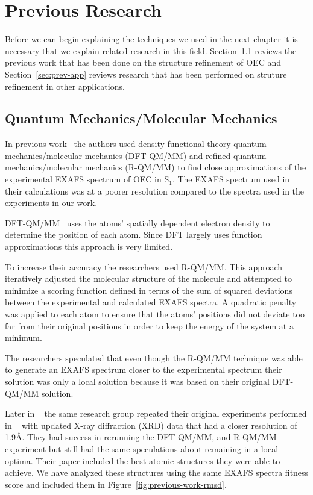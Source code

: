 \chapter{Previous Research}

Before we can begin explaining the techniques we used in the next chapter it is necessary that we explain related research in this field. Section~\ref{sec:prev-work} reviews the previous work that has been done on the structure refinement of OEC and Section~\ref{sec:prev-app} reviews research that has been performed on struture refinement in other applications.

\section{Quantum Mechanics/Molecular Mechanics}
\label{sec:prev-work}

In previous work~\cite{sproviero2008model} the authors used density functional theory quantum mechanics/molecular mechanics (DFT-QM/MM) and refined quantum mechanics/molecular mechanics (R-QM/MM) to find close approximations of the experimental EXAFS spectrum of OEC in S$_{1}$. The EXAFS spectrum used in their calculations was at a poorer resolution compared to the spectra used in the experiments in our work.

DFT-QM/MM~\cite{parr1989density} uses the atoms' spatially dependent electron density to determine the position of each atom. Since DFT largely uses function approximations this approach is very limited.

To increase their accuracy the researchers used R-QM/MM. This approach iteratively adjusted the molecular structure of the molecule and attempted to minimize a scoring function defined in terms of the sum of squared deviations between the experimental and calculated EXAFS spectra. A quadratic penalty was applied to each atom to ensure that the atoms' positions did not deviate too far from their original positions in order to keep the energy of the system at a minimum.

The researchers speculated that even though the R-QM/MM technique was able to generate an EXAFS spectrum closer to the experimental spectrum their solution was only a local solution because it was based on their original DFT-QM/MM solution.

Later in ~\cite{luber2011s1} the same research group repeated their original experiments performed in ~\cite{sproviero2008model} with updated X-ray diffraction (XRD) data that had a closer resolution of 1.9\AA. They had success in rerunning the DFT-QM/MM, and R-QM/MM experiment but still had the same speculations about remaining in a local optima. Their paper included the best atomic structures they were able to achieve. We have analyzed these structures using the same EXAFS spectra fitness score and included them in Figure~\ref{fig:previous-work-rmsd}.

